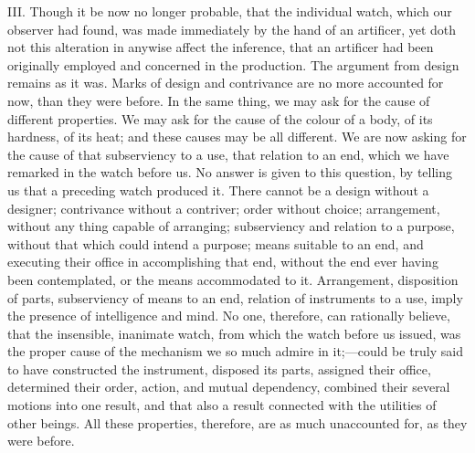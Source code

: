 III. Though it be now no longer probable, that the individual watch,
which our observer had found, was made immediately by the hand
 of an artificer, yet doth not this alteration in anywise
affect the inference, that an artificer had been originally employed
and concerned in the production. The argument from design remains as
it was. Marks of design and contrivance are no more accounted for now,
than they were before. In the same thing, we may ask for the cause of
different properties. We may ask for the cause of the colour of a
body, of its hardness, of its heat; and these causes may be all
different. We are now asking for the cause of that subserviency to a
use, that relation to an end, which we have remarked in the watch
before us. No answer is given to this question, by telling us that a
preceding watch produced it. There cannot be a design without a
designer; contrivance without a contriver; order without choice;
arrangement, without any thing capable of arranging; subserviency and
relation to a purpose, without that which could intend a purpose;
means suitable to an end, and executing their office in accomplishing
that end, without the end ever having been contemplated, or the means
accommodated to it. Arrangement, disposition of parts, subserviency of
means to an end, relation of instruments to a use, imply the presence
of intelligence and mind. No one, therefore, can  rationally
believe, that the insensible, inanimate watch, from which the watch
before us issued, was the proper cause of the mechanism we so much
admire in it;---could be truly said to have constructed the
instrument, disposed its parts, assigned their office, determined
their order, action, and mutual dependency, combined their several
motions into one result, and that also a result connected with the
utilities of other beings. All these properties, therefore, are as
much unaccounted for, as they were before.

